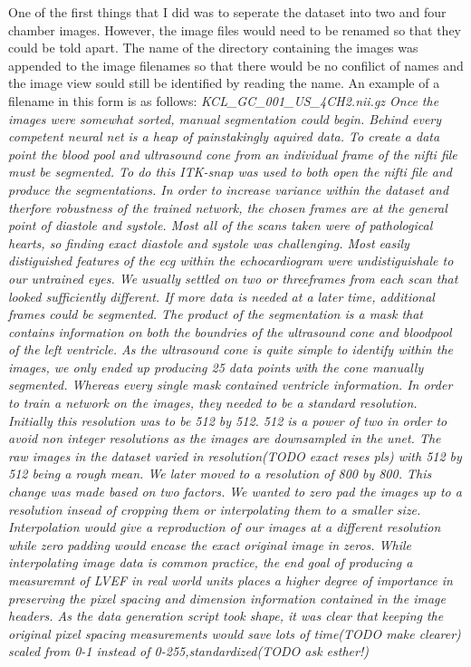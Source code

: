 \documentclass{article}
\begin{document}
One of the first things that I did was to seperate the dataset into two and four chamber images. However, the image files would need to be renamed so that they could be told apart.
The name of the directory containing the images was appended to the image filenames so that there would be no confilict of names and the image view sould still be identified by reading the name.
An example of a filename in this form is as follows:
\it{KCL\_GC\_001\_US\_4CH2.nii.gz}
Once the images were somewhat sorted, manual segmentation could begin. Behind every competent neural net is a heap of painstakingly aquired data.
To create a data point the blood pool and ultrasound cone from an individual frame of the nifti file must be segmented. To do this ITK-snap was used to both open the nifti file and produce the segmentations.
In order to increase variance within the dataset and therfore robustness of the trained network, the chosen frames are at the general point of diastole and systole.
Most all of the scans taken were of pathological hearts, so finding exact diastole and systole was challenging. Most easily distiguished features of the ecg within the echocardiogram were undistiguishale to our untrained eyes.
We usually settled on two or threeframes from each scan that looked sufficiently different.
If more data is needed at a later time, additional frames could be segmented. The product of the segmentation is a mask that contains information on both the boundries of the ultrasound cone and bloodpool of the left ventricle.
As the ultrasound cone is quite simple to identify within the images, we only ended up producing 25 data points with the cone manually segmented.
Whereas every single mask contained ventricle information.
In order to train a network on the images, they needed to be a standard resolution.
Initially this resolution was to be 512 by 512. 512 is a power of two in order to avoid non integer resolutions as the images are downsampled in the unet.
The raw images in the dataset varied in resolution(TODO exact reses pls) with 512 by 512 being a rough mean.
We later moved to a resolution of 800 by 800. This change was made based on two factors. 
We wanted to zero pad the images up to a resolution insead of cropping them or interpolating them to a smaller size.
Interpolation would give a reproduction of our images at a different resolution  while zero padding would encase the exact original image in zeros.
While interpolating image data is common practice, the end goal of producing a measuremnt of LVEF in real world units places a higher degree of importance in preserving the pixel spacing and dimension information contained in the image headers.
As the data generation script took shape, it was clear that keeping the original pixel spacing measurements would save lots of time(TODO make clearer) 
scaled from 0-1 instead of 0-255,standardized(TODO ask esther!)
\end{document}
